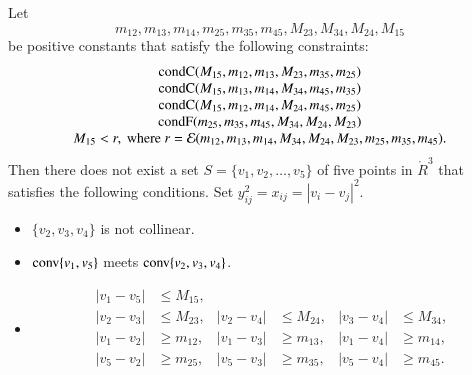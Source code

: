 \begin{lemma}
Let $$m_{12},m_{13},m_{14},m_{25},m_{35},m_{45},M_{23},M_{34},M_{24},M_{15}$$ 
be positive constants that satisfy the following constraints:
	$$
	\begin{array}{clll}
	{\operatorname{condC}}(M_{15},m_{12},m_{13},M_{23},m_{35},m_{25})\\
	{\operatorname{condC}}(M_{15},m_{13},m_{14},M_{34},m_{45},m_{35})\\
	{\operatorname{condC}}(M_{15},m_{12},m_{14},M_{24},m_{45},m_{25})\\
	{\operatorname{condF}}(m_{25},m_{35},m_{45},M_{34},M_{24},M_{23})\\
	M_{15} < r, \text{ where } 
	r = {\mathcal E}(m_{12},m_{13},m_{14},M_{34},M_{24},M_{23},m_{25},m_{35},m_{45}).
	\end{array}
	$$
Then there does not exist a set $S=\{v_1,v_2,\ldots,v_5\}$ of five
points  in $\ring{R}^3$ that satisfies the following conditions.  
Set $y_{ij}^2 = x_{ij} = |v_i-v_j|^2$.
	\begin{itemize}
	\item $\{v_2,v_3,v_4\}$ is not collinear.
	\item ${\operatorname{conv}}\{v_1,v_5\}$ meets ${\operatorname{conv}}\{v_2,v_3,v_4\}$.
	\item 
		$$
		\begin{array}{rlrlrl}
		|v_1-v_5| &\le M_{15},\\
		|v_2-v_3| &\le M_{23}, &|v_2-v_4| &\le M_{24}, & |v_3-v_4|&\le M_{34},\\
		|v_1-v_2| &\ge m_{12},&|v_1-v_3| &\ge m_{13},& |v_1-v_4|&\ge m_{14},\\
		|v_5-v_2| &\ge m_{25},&|v_5-v_3| &\ge m_{35},& |v_5-v_4|&\ge m_{45}.\\
		\end{array}
		$$
	\end{itemize}
\end{lemma}



